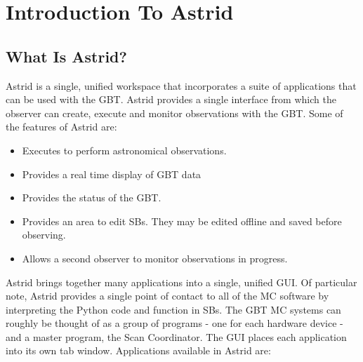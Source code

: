 \chapter{Introduction To Astrid}\label{chap:astrid}
 
\section{What Is Astrid?}

\gls{Astrid} is a single, unified workspace that incorporates a suite of applications 
that can be used with the \gls{GBT}. \gls{Astrid} provides a single interface from
which the observer can create, execute and monitor observations with the \gls{GBT}.
Some of the features of \gls{Astrid} are:

\begin{itemize}[leftmargin=*]
\item Executes  to perform astronomical observations.
\item Provides a real time display of \gls{GBT} data
\item Provides the status of the \gls{GBT}.
\item Provides an area to edit \glspl{SB}. They may be edited offline and saved before
observing.
\item Allows a second observer to monitor observations in progress.
\end{itemize}

\gls{Astrid} brings together many applications into a single, unified \gls{GUI}.
Of particular note, \gls{Astrid} provides a single point of contact to all of
the \gls{MC} software by interpreting the Python code and function in \glspl{SB}.
The \gls{GBT} \gls{MC} systems can roughly be thought of as a group of programs
- one for each hardware device - and a master program, the Scan Coordinator.
The \gls{GUI} places each application into its own tab window.  Applications
available in \gls{Astrid} are:

